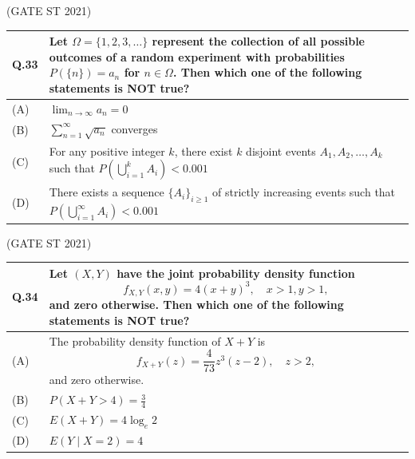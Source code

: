 \documentclass[journal,12pt,onecolumn]{IEEEtran}
\theoremstyle{remark}
\begin{document}
\bigskip
\hfill (GATE ST 2021)
\\
\begin{tabular}{|p{1cm}|p{14cm}|}
\hline
\textbf{Q.33} &
Let $\Omega = \{1,2,3,\dots\}$ represent the collection of all possible outcomes of a random experiment with probabilities $P(\{n\}) = a_n$ for $n \in \Omega$. Then which one of the following statements is NOT true?\\
\hline

(A) & $\lim_{n \to \infty} a_n = 0$\\
\hline
(B) & $\sum_{n=1}^\infty \sqrt{a_n}$ converges\\
\hline
(C) & For any positive integer $k$, there exist $k$ disjoint events $A_1, A_2, \dots, A_k$ such that $P\left(\bigcup_{i=1}^k A_i\right) < 0.001$\\ 
\hline
(D) & There exists a sequence $\{A_i\}_{i\geq 1}$ of strictly increasing events such that $P\left(\bigcup_{i=1}^\infty A_i\right) < 0.001$\\
\hline
\end{tabular}

\bigskip
\hfill (GATE ST 2021)
\\
\begin{tabular}{|p{1cm}|p{14cm}|}
\hline
\textbf{Q.34} &
Let $(X,Y)$ have the joint probability density function
$$
f_{X,Y}(x,y) = 4(x + y)^3, \quad x > 1, y > 1,
$$
and zero otherwise. Then which one of the following statements is NOT true?\\
\hline

(A) & The probability density function of $X + Y$ is
$$
f_{X+Y}(z) = \frac{4}{73} z^3 (z - 2), \quad z > 2,
$$
and zero otherwise.\\
\hline
(B) & $P(X + Y > 4) = \frac{3}{4}$\\
\hline
(C) & $E(X + Y) = 4 \log_e 2$ \\
\hline
(D) & $E(Y \mid X = 2) = 4$\\
\hline
\end{tabular}
\end{document}
